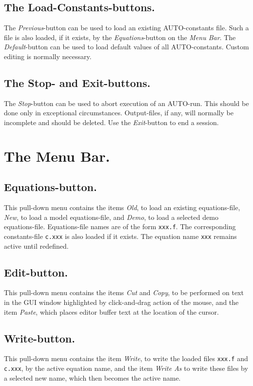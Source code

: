 \documentclass[12pt]{report}
\begin{document}
\subsection{ The Load-Constants-buttons.}
The {\it Previous}-button can be used to load an existing {\cal AUTO}-constants file.
Such a file is also loaded, if it exists,
by the {\it Equations}-button on the {\it Menu Bar}.
The {\it Default}-button can be used
to load  default values of all {\cal AUTO}-constants. 
Custom editing is normally necessary.


\subsection{ The Stop- and Exit-buttons.}
The {\it Stop}-button can be used to abort execution of an {\cal AUTO}-run.
This should be done only in exceptional circumstances.
Output-files, if any, will normally be incomplete and should be deleted.
Use the {\it Exit}-button to end a session.


\section{ The Menu Bar.} \label{sec:GUI_Menu_bar}
\subsection{ Equations-button.}
This pull-down menu contains the items
{\it Old}, to load an existing equations-file,
{\it New}, to load a model equations-file,
and
{\it Demo}, to load a selected demo equations-file.
Equations-file names are of the form {\tt xxx.f}.
The corresponding constants-file {\tt c.xxx} is also loaded if it exists.
The equation name {\tt xxx} remains active until redefined.

\subsection{ Edit-button.}
This pull-down menu contains the items
{\it Cut} and {\it Copy}, 
to be performed on text in the GUI window
highlighted by click-and-drag action of the mouse,
and the item {\it Paste}, which places editor buffer text at the
location of the cursor.



\subsection{ Write-button.}
This pull-down menu contains the item
{\it Write},
to write the loaded files {\tt xxx.f} and {\tt c.xxx},
by the active equation name,
and the item
{\it Write As}
to write these files by a selected new name, which then becomes the active name.
\end{document}
